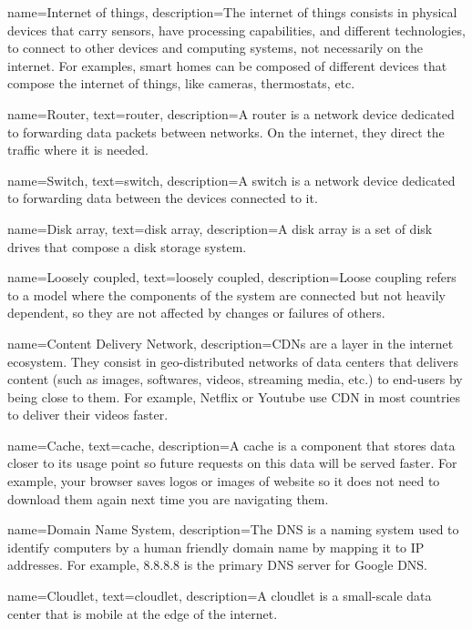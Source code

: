  {
name={Internet of things},
description={The internet of things consists in physical devices that carry sensors, have processing capabilities, and different technologies, to connect to other devices and computing systems, not necessarily on the internet. For examples, smart homes can be composed of different devices that compose the internet of things, like cameras, thermostats, etc.}
}


 {
name={Router},
text={router},
description={A router is a network device dedicated to forwarding data packets between networks. On the internet, they direct the traffic where it is needed.}
}

 {
name={Switch},
text={switch},
description={A switch is a network device dedicated to forwarding data between the devices connected to it.}
}


 {
name={Disk array},
text={disk array},
description={A disk array is a set of disk drives that compose a disk storage system.}
}

 {
name={Loosely coupled},
text={loosely coupled},
description={Loose coupling refers to a model where the components of the system are connected but not heavily dependent, so they are not affected by changes or failures of others.}
}

 {
name={Content Delivery Network},
description={CDNs are a layer in the internet ecosystem. They consist in geo-distributed networks of data centers that delivers content (such as images, softwares, videos, streaming media, etc.) to end-users by being close to them. For example, Netflix or Youtube use CDN in most countries to deliver their videos faster.}
}

 {
name={Cache},
text={cache},
description={A cache is a component that stores data closer to its usage point so future requests on this data will be served faster. For example, your browser saves logos or images of website so it does not need to download them again next time you are navigating them.}
}

 {
name={Domain Name System},
description={The DNS is a naming system used to identify computers by a human friendly domain name by mapping it to IP addresses. For example, 8.8.8.8 is the primary DNS server for Google DNS.}
}

 {
name={Cloudlet},
text={cloudlet},
description={A cloudlet is a small-scale data center that is mobile at the edge of the internet.}
}

